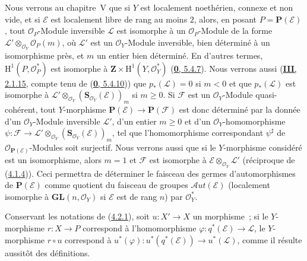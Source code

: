 \begin{remark}[4.2.7]
\label{II.4.2.7-fr}
Nous verrons au chapitre~V que si $Y$ est localement noethérien, connexe et non vide,
et si $\mathcal{E}$ est localement libre de rang au moins $2$, alors, en posant
$P=\mathbf{P}(\mathcal{E})$, tout $\mathcal{O}_P$-Module inversible
$\mathcal{L}$ est isomorphe à un $\mathcal{O}_P$-Module de la forme
$\mathcal{L}'\otimes_{\mathcal{O}_Y}\mathcal{O}_P(m)$, où $\mathcal{L}'$ est
un $\mathcal{O}_Y$-Module inversible, bien déterminé à un isomorphisme près,
et $m$ un entier bien déterminé. En d'autres termes,
$\mathrm{H}^1(P,\mathcal{O}_P^*)$ est isomorphe à
$\mathbf{Z}\times\mathrm{H}^1(Y,\mathcal{O}_Y^*)$
(\hyperref[0.5.4.7-fr]{\textbf{0}, 5.4.7}). Nous verrons aussi
(\hyperref[III.2.1.15-fr]{\textbf{III}, 2.1.15}, compte tenu de
(\hyperref[0.5.4.10-fr]{\textbf{0}, 5.4.10})) que
$p_*(\mathcal{L})=0$ si $m<0$ et que
$p_*(\mathcal{L})$ est isomorphe à
$\mathcal{L}'\otimes_{\mathcal{O}_Y}
(\mathbf{S}_{\mathcal{O}_Y}(\mathcal{E}))_m$ si $m\geq0$. Si $\mathcal{F}$
est un $\mathcal{O}_Y$-Module quasi-cohérent, tout $Y$-morphisme
$\mathbf{P}(\mathcal{E})\to\mathbf{P}(\mathcal{F})$ est donc déterminé par
la donnée d'un $\mathcal{O}_Y$-Module inversible $\mathcal{L}'$, d'un entier
$m\geq0$ et d'un $\mathcal{O}_Y$-homomorphisme
$\psi:\mathcal{F}\to\mathcal{L}'\otimes_{\mathcal{O}_Y}
(\mathbf{S}_{\mathcal{O}_Y}(\mathcal{E}))_m$, tel que l'homomorphisme
correspondant $\psi^\sharp$ de $\mathcal{O}_{\mathbf{P}(\mathcal{E})}$-Modules
soit surjectif. Nous verrons aussi que si le $Y$-morphisme considéré est un
isomorphisme, alors $m=1$ et $\mathcal{F}$ est isomorphe à
$\mathcal{E}\otimes_{\mathcal{O}_Y}\mathcal{L}'$ (réciproque de
(\hyperref[II.4.1.4-fr]{4.1.4})). Ceci permettra de déterminer le faisceau
des germes d'automorphismes de $\mathbf{P}(\mathcal{E})$ comme quotient du
faisceau de groupes $\mathcal{A}ut(\mathcal{E})$ (localement isomorphe à
$\mathbf{GL}(n,\mathcal{O}_Y)$ si $\mathcal{E}$ est de rang $n$) par
$\mathcal{O}_Y^*$.
\end{remark}

\begin{env}[4.2.8]
\label{II.4.2.8-fr}
Conservant les notations de (\hyperref[II.4.2.1-fr]{4.2.1}), soit
$u:X'\to X$ un morphisme~; si le $Y$-morphisme $r:X\to P$ correspond à
l'homomorphisme $\varphi:q^*(\mathcal{E})\to\mathcal{L}$, le $Y$-morphisme
$r\circ u$ correspond à
$u^*(\varphi):u^*(q^*(\mathcal{E}))\to u^*(\mathcal{L})$, comme il résulte
aussitôt des définitions.
\end{env}

